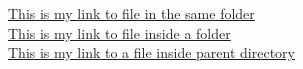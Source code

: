 \documentclass{article}
\begin{document}
\href{run:test1.txt}{This is my link to file in the same folder}\\
\href{run:./file/test2.txt}{This is my link to file inside a folder }\\
\href{run:../sampletextfile/test3.txt}{This is my link to a file inside parent directory}
\end{document}
